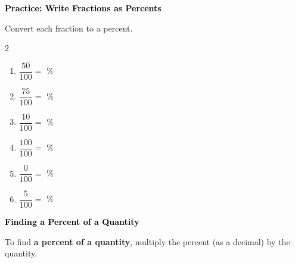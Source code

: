 \documentclass[12pt, letterpaper, fleqn]{article}
\newcommand{\blankshorter}{\underline{\hspace{1.5cm}}}
\begin{document}
\vspace{4mm}

\begin{tcolorbox}[colback=customteal!20]
\large\textcolor{black}{\textbf{Practice: Write Fractions as Percents}}
\end{tcolorbox}

\noindent
Convert each fraction to a percent.

\vspace{3mm}

\begin{multicols}{2}
\begin{enumerate}[itemsep=1.2cm, leftmargin=0.6cm]
\item $\dfrac{50}{100} = $ \blankshorter \; \%
\item $\dfrac{75}{100} = $ \blankshorter \; \%
\item $\dfrac{10}{100} = $ \blankshorter \; \%
\item $\dfrac{100}{100} = $ \blankshorter \; \%
\item $\dfrac{0}{100} = $ \blankshorter \; \%
\item $\dfrac{5}{100} = $ \blankshorter \; \%
\end{enumerate}
\end{multicols}

\newpage

\begin{tcolorbox}[colback=customteal!20]
\large\textcolor{black}{\textbf{Finding a Percent of a Quantity}}
\end{tcolorbox}

\noindent
To find \textbf{a percent of a quantity}, multiply the percent (as a decimal) by the quantity.

\vspace{3mm}
\end{document}
